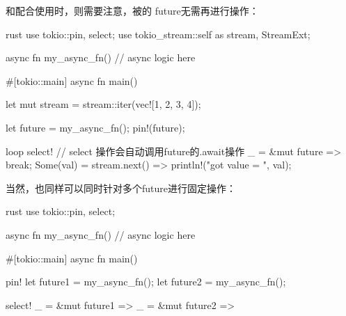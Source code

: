 和配合使用时，则需要注意，被的
future无需再进行操作：
\begin{code-block}{rust}
use tokio::{pin, select};
use tokio_stream::{self as stream, StreamExt};

async fn my_async_fn() {
    // async logic here
}

#[tokio::main]
async fn main() {
    let mut stream = stream::iter(vec![1, 2, 3, 4]);

    let future = my_async_fn();
    pin!(future);

    loop {
        select! {
            // select 操作会自动调用future的.await操作
            _ = &mut future => {
                break;
            }
            Some(val) = stream.next() => {
                println!("got value = {}", val);
            }
        }
    }
}
\end{code-block}

当然，也同样可以同时针对多个future进行固定操作：
\begin{code-block}{rust}
use tokio::{pin, select};

async fn my_async_fn() {
    // async logic here
}

#[tokio::main]
async fn main() {
    pin! {
        let future1 = my_async_fn();
        let future2 = my_async_fn();
    }

    select! {
        _ = &mut future1 => {}
        _ = &mut future2 => {}
    }
}
\end{code-block}

